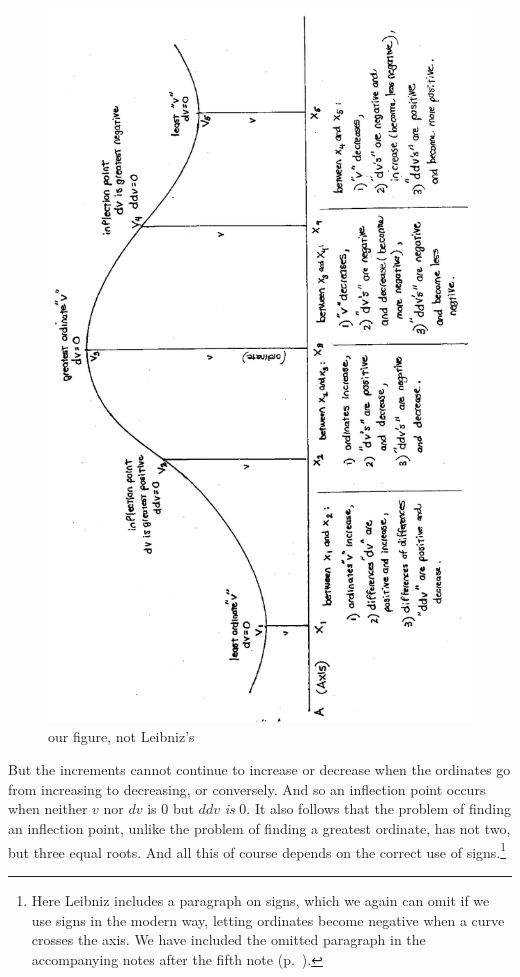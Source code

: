 \documentclass[polutonikogreek,english,twoside,openright]{article}
\begin{document}
\begin{figure}[p]
  \begin{center}
    \includegraphics[width=.89\textwidth]{fig/Figure9}
    \caption{our figure, not Leibniz's}
    \label{inflection}
  \end{center}
\end{figure} But the increments cannot continue to increase or
decrease when the ordinates go from increasing to decreasing, or
conversely.  And so an inflection point occurs when neither $v$ nor
$dv$ is 0 but $ddv$ {\em is} 0.  It also follows that the problem of
finding an inflection point, unlike the problem of finding a greatest
ordinate, has not two, but three equal roots. And all this of course depends on the correct use
of signs.\footnote{Here Leibniz includes a paragraph on signs, which
  we again can omit if we use signs in the modern way, letting
  ordinates become negative when a curve crosses the axis.  We have
  included the omitted paragraph in the accompanying notes after the
  fifth note (p.~\pageref{ompar}).}\label{ambsigns}
\end{document}
